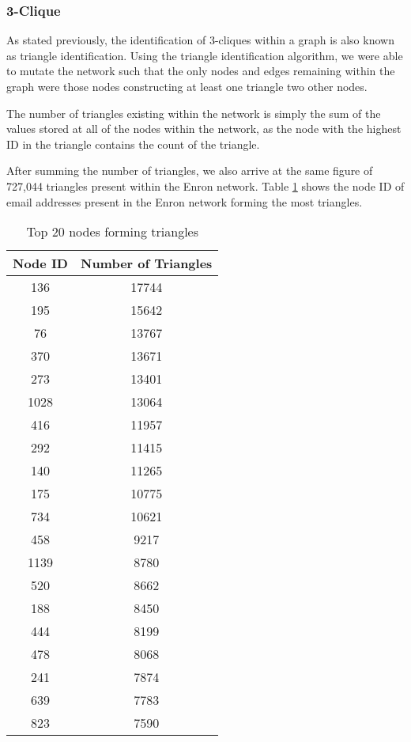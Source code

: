 \subsubsection{3-Clique}
As stated previously, the identification of 3-cliques within a graph is also known as triangle identification. Using the triangle identification algorithm, we were able to mutate the network such that the only nodes and edges remaining within the graph were those nodes constructing at least one triangle two other nodes.

The number of triangles existing within the network is simply the sum of the values stored at all of the nodes within the network, as the node with the highest ID in the triangle contains the count of the triangle.

After summing the number of triangles, we also arrive at the same figure of 727,044 triangles present within the Enron network. Table \ref{tab:enrontriangles} shows the node ID of email addresses present in the Enron network forming the most triangles.

\begin{table}%
\centering
\begin{tabular}{|c|c|}
\hline
Node ID & Number of Triangles \\
\hline
136 & 17744 \\
195 & 15642 \\
76 & 13767 \\
370 & 13671 \\
273 & 13401 \\
1028 & 13064 \\
416 & 11957 \\
292 & 11415 \\
140 & 11265 \\
175 & 10775 \\
734 & 10621 \\
458 & 9217 \\
1139 & 8780 \\
520 & 8662 \\
188 & 8450 \\
444 & 8199 \\
478 & 8068 \\
241 & 7874 \\
639 & 7783 \\
823 & 7590 \\
\hline
\end{tabular}
\caption{Top 20 nodes forming triangles}
\label{tab:enrontriangles}
\end{table}

